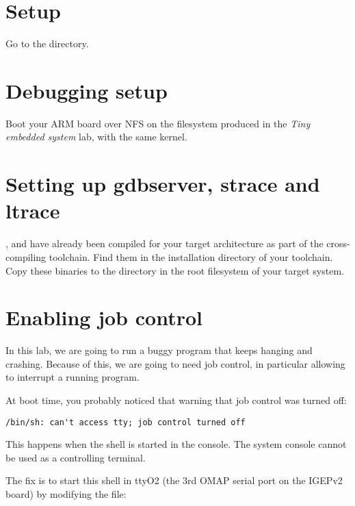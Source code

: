 
\section{Setup}

Go to the  directory.

\section{Debugging setup}

Boot your ARM board over NFS on the filesystem produced in the {\em
  Tiny embedded system} lab, with the same kernel.

\section{Setting up gdbserver, strace and ltrace}

,  and  have already been
compiled for your target architecture as part of the cross-compiling
toolchain. Find them in the installation directory of your
toolchain. Copy these binaries to the  directory in
the root filesystem of your target system.

\section{Enabling job control}

In this lab, we are going to run a buggy program that keeps hanging
and crashing.  Because of this, we are going to need job control, in
particular \code{[Ctrl] [C]} allowing to interrupt a running program.

At boot time, you probably noticed that warning that job control was
turned off:

\begin{verbatim}
/bin/sh: can't access tty; job control turned off
\end{verbatim}

This happens when the shell is started in the console. The system
console cannot be used as a controlling terminal.

The fix is to start this shell in ttyO2 (the 3rd OMAP serial port on
the IGEPv2 board) by modifying the  file:

